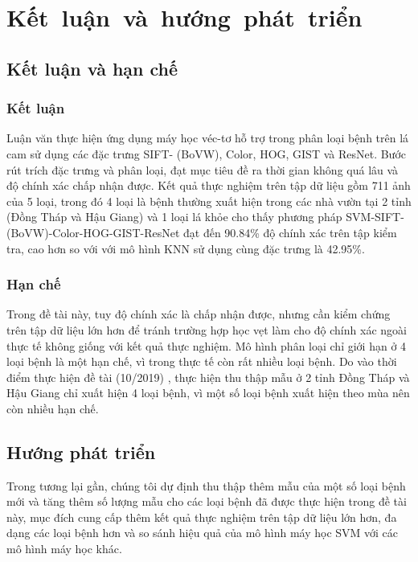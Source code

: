 \chapter{\mbox{Kết luận và hướng phát triển}} \label{chapter05}

\section{Kết luận và hạn chế}
\subsection{Kết luận}
Luận văn thực hiện ứng dụng máy học véc-tơ hỗ trợ trong phân loại bệnh trên lá cam sử dụng các đặc trưng SIFT- (BoVW), Color, HOG, GIST và ResNet. Bước rút trích đặc trưng và phân loại, đạt mục tiêu đề ra thời gian không quá lâu và độ chính xác chấp nhận được. Kết quả thực nghiệm trên tập dữ liệu gồm 711 ảnh của 5 loại, trong đó 4 loại là bệnh thường xuất hiện trong các nhà vườn tại 2 tỉnh (Đồng Tháp và Hậu Giang) và 1 loại lá khỏe cho thấy phương pháp SVM-SIFT-(BoVW)-Color-HOG-GIST-ResNet đạt đến 90.84\% độ chính xác trên tập kiểm tra, cao hơn so với với mô hình KNN sử dụng cùng đặc trưng là 42.95\%.

\subsection{Hạn chế}
Trong đề tài này, tuy độ chính xác là chấp nhận được, nhưng cần kiểm chứng trên tập dữ liệu lớn hơn để tránh trường hợp học vẹt làm cho độ chính xác ngoài thực tế không giống với kết quả thực nghiệm. Mô hình phân loại chỉ giới hạn ở 4 loại bệnh là một hạn chế, vì trong thực tế còn rất nhiều loại bệnh. Do vào thời điểm thực hiện đề tài (10/2019) , thực hiện thu thập mẫu ở 2 tỉnh Đồng Tháp và Hậu Giang chỉ xuất hiện 4 loại bệnh, vì một số loại bệnh xuất hiện theo mùa nên còn nhiều hạn chế.


\section{Hướng phát triển}
Trong tương lại gần, chúng tôi dự định thu thập thêm mẫu của một số loại bệnh mới và tăng thêm số lượng mẫu cho các loại bệnh đã được thực hiện trong đề tài này, mục đích cung cấp thêm kết quả thực nghiệm trên tập dữ liệu lớn hơn, đa dạng các loại bệnh hơn và so sánh hiệu quả của mô hình máy học SVM với các mô hình máy học khác.